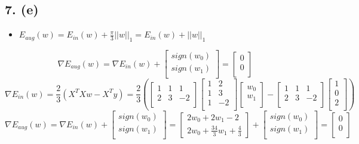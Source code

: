 \documentclass[12pt,a4paper]{article}
\begin{document}
\subsection{7. (e)}
\begin{itemize}
\item $E_{aug}(w) = E_{in}(w) + \frac{\pi}{3}||w||_1 = E_{in}(w) + ||w||_1$

\end{itemize}
\[
\nabla E_{aug}(w) = 
    \nabla E_{in}(w) +
    \begin{bmatrix}
        sign(w_0) \\
        sign(w_1) \\
    \end{bmatrix} = 
    \begin{bmatrix}
        0 \\
        0 \\
    \end{bmatrix}
\]
\[
\nabla E_{in}(w) = 
    \frac{2}{3}(X^TXw-X^Ty) = 
    \frac{2}{3}(
    \begin{bmatrix}
        1 & 1 & 1 \\
        2 & 3 & -2 \\
    \end{bmatrix}
    \begin{bmatrix}
        1 & 2 \\
        1 & 3 \\
        1 & -2 \\
    \end{bmatrix}
    \begin{bmatrix}
        w_0 \\
        w_1 \\
    \end{bmatrix} - 
    \begin{bmatrix}
        1 & 1 & 1 \\
        2 & 3 & -2 \\
    \end{bmatrix}
    \begin{bmatrix}
        1 \\
        0 \\
        2 \\
    \end{bmatrix} 
    )
\]
\[
\nabla E_{aug}(w) =
    \nabla E_{in}(w) +
    \begin{bmatrix}
        sign(w_0) \\
        sign(w_1) \\
    \end{bmatrix} = 
    \begin{bmatrix}
        2w_0+2w_1-2 \\
        2w_0+\frac{34}{3}w_1+\frac{4}{3}
    \end{bmatrix} +
        \begin{bmatrix}
        sign(w_0) \\
        sign(w_1) \\
    \end{bmatrix} = 
    \begin{bmatrix}
        0 \\
        0 \\
    \end{bmatrix}
\]
\end{document}

